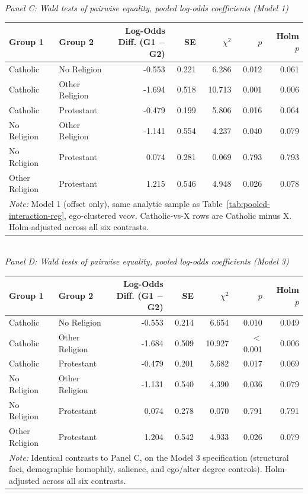 \begin{table}[htbp]
\begin{tabular}{llrrc}
\end{tabular}
\\[8pt]
\textit{Panel C: Wald tests of pairwise equality, pooled log-odds coefficients (Model 1)}\\[2pt]
\begin{tabular}{llrrrrr}
\toprule
Group 1 & Group 2 & Log-Odds Diff. (G1 $-$ G2) & SE & $\chi^2$ & $p$ & Holm $p$ \\
\midrule
Catholic & No Religion & -0.553 & 0.221 & 6.286 & 0.012 & 0.061 \\
Catholic & Other Religion & -1.694 & 0.518 & 10.713 & 0.001 & 0.006 \\
Catholic & Protestant & -0.479 & 0.199 & 5.806 & 0.016 & 0.064 \\
No Religion & Other Religion & -1.141 & 0.554 & 4.237 & 0.040 & 0.079 \\
No Religion & Protestant & 0.074 & 0.281 & 0.069 & 0.793 & 0.793 \\
Other Religion & Protestant & 1.215 & 0.546 & 4.948 & 0.026 & 0.078 \\
\bottomrule
\multicolumn{7}{p{0.95\textwidth}}{\footnotesize \textit{Note:} Model 1 (offset only), same analytic sample as Table~\ref{tab:pooled-interaction-reg}, ego-clustered vcov. Catholic-vs-X rows are Catholic minus X. Holm-adjusted across all six contrasts.} \\
\end{tabular}
\\[8pt]
\textit{Panel D: Wald tests of pairwise equality, pooled log-odds coefficients (Model 3)}\\[2pt]
\begin{tabular}{llrrrrr}
\toprule
Group 1 & Group 2 & Log-Odds Diff. (G1 $-$ G2) & SE & $\chi^2$ & $p$ & Holm $p$ \\
\midrule
Catholic & No Religion & -0.553 & 0.214 & 6.654 & 0.010 & 0.049 \\
Catholic & Other Religion & -1.684 & 0.509 & 10.927 & $<$0.001 & 0.006 \\
Catholic & Protestant & -0.479 & 0.201 & 5.682 & 0.017 & 0.069 \\
No Religion & Other Religion & -1.131 & 0.540 & 4.390 & 0.036 & 0.079 \\
No Religion & Protestant & 0.074 & 0.278 & 0.070 & 0.791 & 0.791 \\
Other Religion & Protestant & 1.204 & 0.542 & 4.933 & 0.026 & 0.079 \\
\bottomrule
\multicolumn{7}{p{0.95\textwidth}}{\footnotesize \textit{Note:} Identical contrasts to Panel C, on the Model 3 specification (structural foci, demographic homophily, salience, and ego/alter degree controls). Holm-adjusted across all six contrasts.} \\
\end{tabular}
\end{table}
